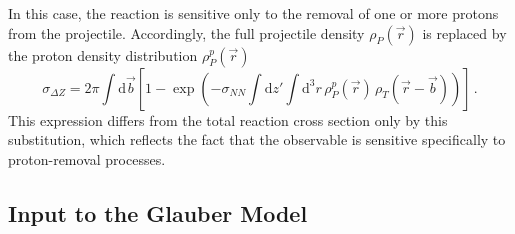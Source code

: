 In this case, the reaction is sensitive only to the removal of one or more protons from the projectile. 
Accordingly, the full projectile density \( \rho_P(\vec{r}) \) is replaced by the proton density distribution \( \rho_P^p(\vec{r}) \)
\begin{equation}\label{eq:final_cc_formula}
\sigma_{\Delta Z} = 2\pi \int \mathrm{d} \vec{b} \left[ 1 - \exp \left( -\sigma_{NN} \int \mathrm{d} z' \int \mathrm{d}^3 r \, \rho_P^p(\vec{r}) \, \rho_T(\vec{r} - \vec{b}) \right) \right] \, .
\end{equation}
This expression differs from the total reaction cross section only by this substitution, which reflects the fact that the observable is sensitive specifically to proton-removal processes.


\subsection{Input to the Glauber Model}

